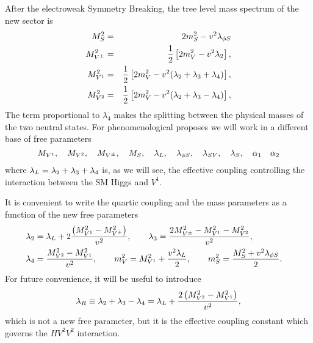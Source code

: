 After the electroweak Symmetry Breaking, the tree level mass spectrum of the new sector is
\begin{eqnarray}
M^2_{S} &=& 2m_S^2 - v^2\ld[\phi S] \label{MassS}\\
M^2_{V^{\pm}} &=& \frac{1}{2}\left[2m_V^2 - v^2 \lambda_2 \right], \label{MassVc}\\
M^2_{V^1} &=& \frac{1}{2}\left[2m_V^2 - v^2(\lambda_2 + \lambda_3 + \lambda_4)\right], \label{MassV1}\\
M^2_{V^2} &=& \frac{1}{2}\left[2m_V^2 - v^2(\lambda_2 + \lambda_3 - \lambda_4)\right],  \label{MassV2}
\end{eqnarray}
The term proportional to $\lambda_4$ makes the splitting between the physical masses of the two neutral states. For phenomenological proposes we will work in a different base of free parameters
\begin{equation}
\Mv[1], \quad \Mv[2], \quad \Mvc, \quad M_{S}, \quad \lamL, \quad \ld[\phi S], \quad \ld[SV], \quad \ld[S], \quad \alpha_1 \quad \alpha_2 \label{parameters}
\end{equation} 
where $\lamL=\ld[2]+\ld[3]+\ld[4]$ is, as we will see, the effective coupling controlling  the interaction between the SM Higgs and $V^1$.

It is convenient to write  the quartic coupling and the mass parameters as a function of the new free parameters
\begin{eqnarray} 
\nonumber &\displaystyle \ld[2] = \ld[L] + 2\frac{\left(\Mv[1]^2-\Mvc^2\right)}{v^2},  \qquad  \displaystyle \ld[3] = \frac{2\Mvc^2 - \Mv[1]^2 - \Mv[2]^2}{v^2},& \\
&\displaystyle \ld[4] = \frac{\Mv[2]^2 - \Mv[1]^2}{v^2}, \qquad \displaystyle m_V^2 = \Mv[1]^2 + \frac{v^2\ld[L]}{2}, \qquad \displaystyle m_S^2 = \frac{M_S^2 + v^2\ld[\phi S]}{2}.&  \label{lambda-couplings}
\end{eqnarray}
For future convenience, it will be useful to introduce
\begin{eqnarray}\label{eq:lamR}
 \lambda_R \equiv \ld[2]+\ld[3]-\ld[4] = \lambda_L + \frac{2\left(M_{V^2}^2 - M_{V^1}^2\right)}{v^2},
\end{eqnarray}
which is not a new free parameter, but it is the effective coupling constant which governs the $HV^2V^2$ interaction.

